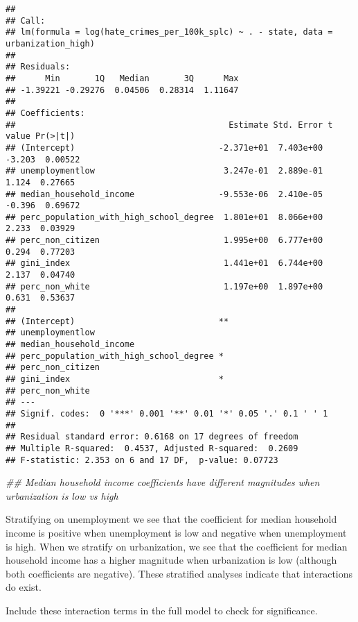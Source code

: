 \documentclass[
]{article}
\newenvironment{Shaded}{\begin{snugshade}}{\end{snugshade}}
\newcommand{\CommentTok}[1]{\textcolor[rgb]{0.56,0.35,0.01}{\textit{#1}}}
\begin{document}
\begin{verbatim}
## 
## Call:
## lm(formula = log(hate_crimes_per_100k_splc) ~ . - state, data = urbanization_high)
## 
## Residuals:
##      Min       1Q   Median       3Q      Max 
## -1.39221 -0.29276  0.04506  0.28314  1.11647 
## 
## Coefficients:
##                                           Estimate Std. Error t value Pr(>|t|)
## (Intercept)                             -2.371e+01  7.403e+00  -3.203  0.00522
## unemploymentlow                          3.247e-01  2.889e-01   1.124  0.27665
## median_household_income                 -9.553e-06  2.410e-05  -0.396  0.69672
## perc_population_with_high_school_degree  1.801e+01  8.066e+00   2.233  0.03929
## perc_non_citizen                         1.995e+00  6.777e+00   0.294  0.77203
## gini_index                               1.441e+01  6.744e+00   2.137  0.04740
## perc_non_white                           1.197e+00  1.897e+00   0.631  0.53637
##                                           
## (Intercept)                             **
## unemploymentlow                           
## median_household_income                   
## perc_population_with_high_school_degree * 
## perc_non_citizen                          
## gini_index                              * 
## perc_non_white                            
## ---
## Signif. codes:  0 '***' 0.001 '**' 0.01 '*' 0.05 '.' 0.1 ' ' 1
## 
## Residual standard error: 0.6168 on 17 degrees of freedom
## Multiple R-squared:  0.4537, Adjusted R-squared:  0.2609 
## F-statistic: 2.353 on 6 and 17 DF,  p-value: 0.07723
\end{verbatim}

\begin{Shaded}
\begin{Highlighting}[]
\CommentTok{## Median household income coefficients have different magnitudes when urbanization is low vs high}
\end{Highlighting}
\end{Shaded}

Stratifying on unemployment we see that the coefficient for median
household income is positive when unemployment is low and negative when
unemployment is high. When we stratify on urbanization, we see that the
coefficient for median household income has a higher magnitude when
urbanization is low (although both coefficients are negative). These
stratified analyses indicate that interactions do exist.

Include these interaction terms in the full model to check for
significance.
\end{document}
